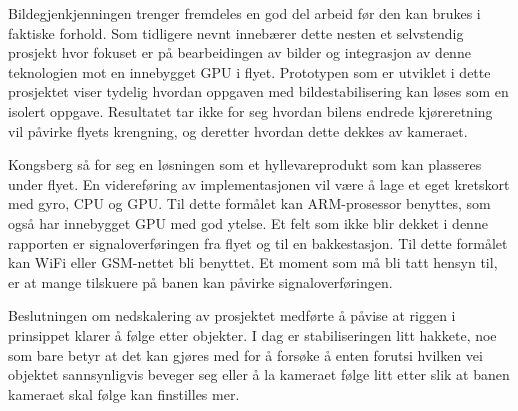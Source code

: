Bildegjenkjenningen trenger fremdeles en god del arbeid før den kan brukes i faktiske forhold. Som tidligere nevnt innebærer dette nesten et selvstendig prosjekt hvor fokuset er på bearbeidingen av bilder og integrasjon av denne teknologien mot en innebygget GPU i flyet. Prototypen som er utviklet i dette prosjektet viser tydelig hvordan oppgaven med bildestabilisering kan løses som en isolert oppgave. Resultatet tar ikke for seg hvordan bilens endrede kjøreretning vil påvirke flyets krengning, og deretter hvordan dette dekkes av kameraet.

Kongsberg så for seg en løsningen som et hyllevareprodukt som kan plasseres under flyet. En videreføring av implementasjonen vil være å lage et eget kretskort med gyro, CPU og GPU. Til dette formålet kan ARM-prosessor benyttes, som også har innebygget GPU med god ytelse. Et felt som ikke blir dekket i denne rapporten er signaloverføringen fra flyet og til en bakkestasjon. Til dette formålet kan WiFi eller GSM-nettet bli benyttet. Et moment som må bli tatt hensyn til, er at mange tilskuere på banen kan påvirke signaloverføringen.

Beslutningen om nedskalering av prosjektet medførte å påvise at riggen i prinsippet klarer å følge etter objekter. I dag er stabiliseringen litt hakkete, noe som bare betyr at det kan gjøres med for å forsøke å enten forutsi hvilken vei objektet sannsynligvis beveger seg eller å la kameraet følge litt etter slik at banen kameraet skal følge kan finstilles mer.

